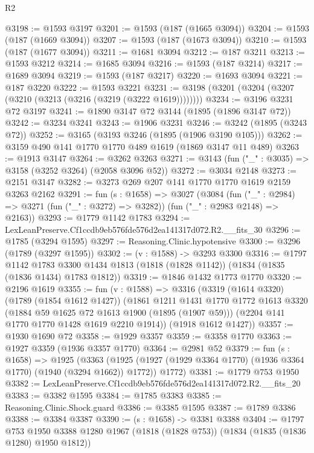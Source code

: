 \begin{lexlean}{R2}
\begin{coremodule}
@3198 := @1593 @3197
@3201 := @1593 (@187 (@1665 @3094))
@3204 := @1593 (@187 (@1669 @3094))
@3207 := @1593 (@187 (@1673 @3094))
@3210 := @1593 (@187 (@1677 @3094))
@3211 := @1681 @3094
@3212 := @187 @3211
@3213 := @1593 @3212
@3214 := @1685 @3094
@3216 := @1593 (@187 @3214)
@3217 := @1689 @3094
@3219 := @1593 (@187 @3217)
@3220 := @1693 @3094
@3221 := @187 @3220
@3222 := @1593 @3221
@3231 := @3198 (@3201 (@3204 (@3207 (@3210 (@3213 (@3216 (@3219 (@3222 @1619))))))))
@3234 := @3196 @3231 @72 @3197
@3241 := @1890 @3147 @72 @3144 (@1895 (@1896 @3147 @72))
@3242 := @3234 @3241
@3243 := @1906 @3231
@3246 := @3242 (@1895 (@3243 @72))
@3252 := @3165 (@3193 @3246 (@1895 (@1906 @3190 @105)))
@3262 := @3159 @490 @141 @1770 @1770 @489 @1619 (@1869 @3147 @11 @489)
@3263 := @1913 @3147
@3264 := @3262 @3263
@3271 := @3143 (fun ("_" : @3035) => @3158 (@3252 @3264) (@2058 @3096 @52))
@3272 := @3034 @2148
@3273 := @2151 @3147
@3282 := @3273 @269 @207 @141 @1770 @1770 @1619 @2159 @3263 @2162
@3291 := fun (s : @1658) =>
  @3027
    (@3084
      (fun ("_" : @2984) => @3271 (fun ("_" : @3272) => @3282))
      (fun ("_" : @2983 @2148) => @2163))
@3293 := @1779 @1142 @1783
@3294 := LexLeanPreserve.Cf1ccdb9eb576fde576d2ea141317d072.R2.__fits_30
@3296 := @1785 (@3294 @1595)
@3297 := Reasoning.Clinic.hypotensive
@3300 := @3296 (@1789 (@3297 @1595))
@3302 := (v : @1588) -> @3293 @3300
@3316 := @1797
    @1142
    @1783
    @3300
    @1434
    @1813
    (@1818 (@1828 @1142))
    (@1834 (@1835 (@1836 @1434) @1783 @1812))
@3319 := @1846 @1432 @1773 @1770
@3320 := @2196 @1619
@3355 := fun (v : @1588) =>
  @3316
    (@3319
      (@1614 @3320)
      (@1789 (@1854 @1612 @1427))
      (@1861
        @1211
        @1431
        @1770
        @1772
        @1613
        @3320
        (@1884 @59 @1625 @72 @1613 @1900 (@1895 (@1907 @59)))
        (@2204 @141 @1770 @1770 @1428 @1619 @2210 @1914))
      (@1918 @1612 @1427))
@3357 := @1930 @1690 @72
@3358 := @1929 @3357
@3359 := @3358 @1770
@3363 := @1927 @3359 (@1936 @3357 @1770)
@3364 := @2981 @52
@3379 := fun (s : @1658) =>
  @1925
    (@3363
      (@1925 (@1927 (@1929 @3364 @1770) (@1936 @3364 @1770) (@1940 (@3294 @1662)) @1772))
      @1772)
@3381 := @1779 @753 @1950
@3382 := LexLeanPreserve.Cf1ccdb9eb576fde576d2ea141317d072.R2.__fits_20
@3383 := @3382 @1595
@3384 := @1785 @3383
@3385 := Reasoning.Clinic.Shock.guard
@3386 := @3385 @1595
@3387 := @1789 @3386
@3388 := @3384 @3387
@3390 := (s : @1658) -> @3381 @3388
@3404 := @1797
    @753
    @1950
    @3388
    @1280
    @1967
    (@1818 (@1828 @753))
    (@1834 (@1835 (@1836 @1280) @1950 @1812))

\end{coremodule}
\end{lexlean}
